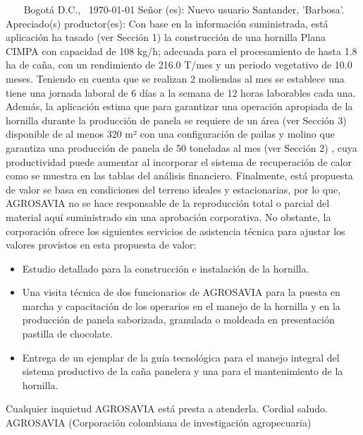 \documentclass{article}%
\begin{document}
\begin{large}%
\textcolor{white}{ 
HH
}%
\linebreak%
Bogotá D.C., %
\ {\today}%
\newline%
 \newline%
%
\linebreak%
\newline%
Señor (es):%
\newline%
Nuevo usuario%
\newline%
Santander,  'Barbosa'.%
\newline%
 \newline%
%
\newline%
Apreciado(s) productor(es):%
\newline%
 \newline%
%
Con base en la información suministrada, está aplicación ha tasado (ver Sección 1) la construcción de una hornilla Plana CIMPA con capacidad de 108 kg/h; adecuada para el procesamiento de hasta 1.8 ha de caña, con un rendimiento de 216.0 T/mes y un periodo vegetativo de 10.0 meses. Teniendo en cuenta que se realizan 2 moliendas al mes se establece una tiene una jornada laboral de 6 días a la semana de 12 horas laborables cada una. \newline%
 Además, la aplicación estima que para garantizar una operación apropiada de la hornilla durante la producción de panela se requiere de un área (ver Sección 3) disponible de al menos 320 m² con una configuración de pailas y molino que garantiza una producción de panela de 50 toneladas al mes (ver Sección 2)%
, cuya productividad puede aumentar al incorporar el sistema de recuperación de calor como se muestra en las tablas del análisis financiero.%
\newline%
 Finalmente, está propuesta de valor se basa en condiciones del terreno ideales y estacionarias, por lo que, AGROSAVIA no se hace responsable de la reproducción total o parcial del material aquí suministrado sin una aprobación corporativa. No obstante, la corporación ofrece los siguientes servicios de asistencia técnica para ajustar los valores provistos en esta propuesta de valor:%
\begin{itemize}%
\item%
Estudio detallado para la construcción e instalación de la hornilla.%
\item%
Una visita técnica de dos funcionarios de AGROSAVIA para la puesta en marcha y capacitación de los operarios en el manejo de la hornilla y en la producción de panela saborizada, granulada o moldeada en presentación pastilla de chocolate.%
\item%
Entrega de un ejemplar de la guía tecnológica para el manejo integral del sistema productivo de la caña panelera y una para el mantenimiento de la hornilla.%
\end{itemize}%
Cualquier inquietud AGROSAVIA está presta a atenderla.\newline%
Cordial saludo.\newline%
\newline%
 \newline%
 \newline%
 \newline%
AGROSAVIA (Corporación colombiana de investigación agropecuaria)%
\end{large}%
\end{document}
